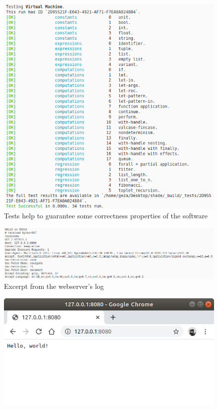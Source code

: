 \documentclass[%
    12pt,
    bibliography=toc,
    listof=leveldown,%
    oneside
]{book}
\begin{document}
\begin{appendices}
\begin{figure}
    \centering
    \includegraphics[width=35em]{screenshots/tests.png}

    \caption{Tests help to guarantee some correctness properties of the software}
    \label{fig:app-screenshot-tests}
\end{figure}

\begin{figure}
    \centering
    \includegraphics[width=35em]{screenshots/webserver_log.png}
    
    \caption{Excerpt from the webserver's log}
    \label{fig:app-screenshot-webserver-log}
\end{figure}

\begin{figure}
    \centering
    \includegraphics[width=35em]{screenshots/webserver_hello_world.png}


\end{figure}
\end{appendices}
\end{document}
